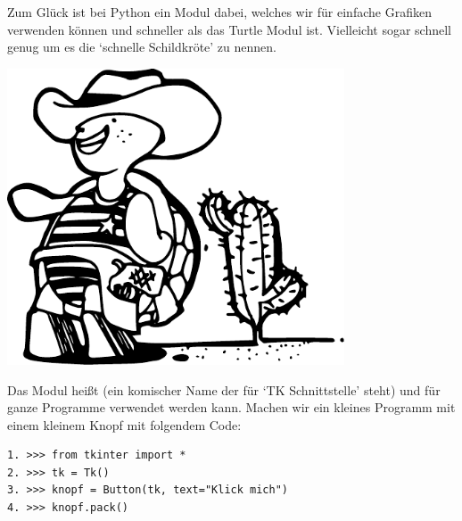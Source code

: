 Zum Glück ist bei Python ein Modul dabei, welches wir für einfache Grafiken verwenden können und schneller als das Turtle Modul ist. Vielleicht sogar schnell genug um es die `schnelle Schildkröte' zu nennen.

\begin{center}
\includegraphics*[width=100mm]{images/turtle2}
\end{center}

Das Modul heißt  (ein komischer Name der für `TK Schnittstelle' steht) und für ganze Programme verwendet werden kann. Machen wir ein kleines Programm mit einem kleinem Knopf mit folgendem Code:

\begin{Verbatim}[frame=single]
1. >>> from tkinter import *
2. >>> tk = Tk()
3. >>> knopf = Button(tk, text="Klick mich")
4. >>> knopf.pack()
\end{Verbatim}

